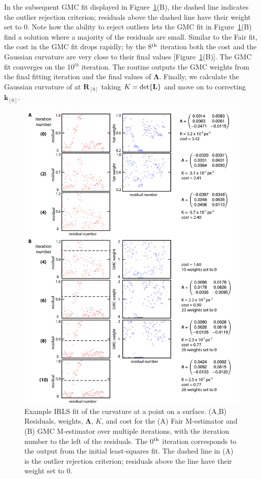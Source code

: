 In the subsequent GMC fit displayed in Figure~\ref{f:3-IRLSexample}(B), the dashed line indicates the outlier rejection criterion; residuals above the dashed line have their weight set to 0.
Note how the ability to reject outliers lets the GMC fit in Figure~\ref{f:3-IRLSexample}(B) find a solution where a majority of the residuals are small.
Similar to the Fair fit, the cost in the GMC fit drops rapidly; by the 8$^{\rm th}$ iteration both the cost and the Gaussian curvature are very close to their final values [Figure~\ref{f:3-IRLSexample}(B)].
The GMC fit converges on the 10$^{th}$ iteration.
The routine outputs the GMC weights from the final fitting iteration and the final values of $\bm{\Lambda}$.
Finally, we calculate the Gaussian curvature of at $\mathbf{R}_{[0]}$ taking $K = \textup{det}\{ \mathbf{L} \}$ and move on to correcting $\mathbf{k}_{[0]}$.

\begin{figure}[H]
  \centering
  \includegraphics[scale=0.95]{figures/C3/Ch3-Figs_IRLSexample.png}
  \caption{Example IRLS fit of the curvature at a point on a surface.
  (A,B) Residuals, weights, $\bm{\Lambda}$, $K$, and cost for the (A) Fair M-estimator and (B) GMC M-estimator over multiple iterations, with the iteration number to the left of the residuals.
  The 0$^{\rm th}$ iteration corresponds to the output from the initial least-squares fit. The dashed line in (A) is the outlier rejection criterion; residuals above the line have their weight set to 0.}\label{f:3-IRLSexample}
\end{figure}

